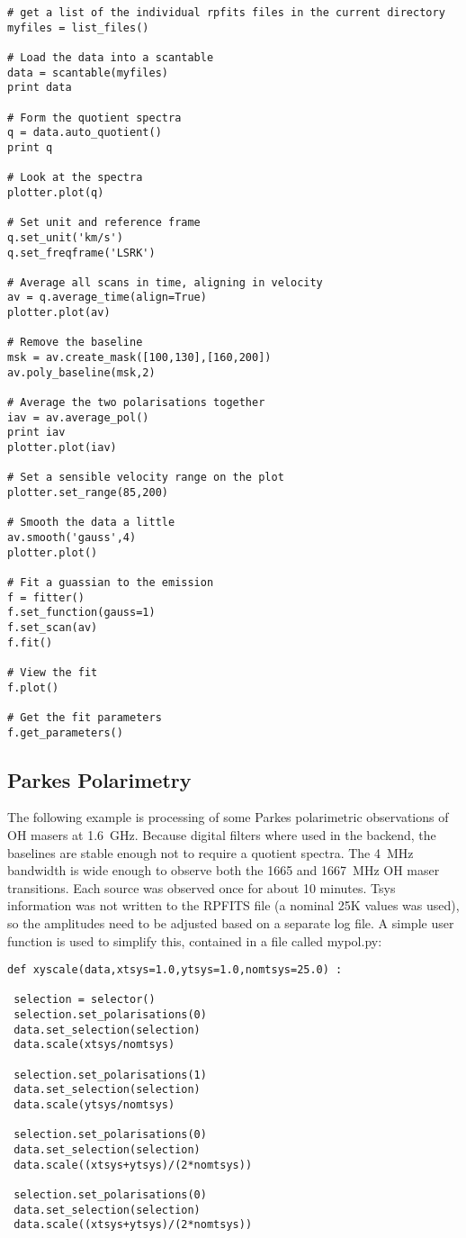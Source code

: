 \documentclass[11pt]{article}
\begin{document}
\begin{verbatim}
# get a list of the individual rpfits files in the current directory
myfiles = list_files()

# Load the data into a scantable
data = scantable(myfiles)
print data

# Form the quotient spectra
q = data.auto_quotient()
print q

# Look at the spectra
plotter.plot(q)

# Set unit and reference frame
q.set_unit('km/s')
q.set_freqframe('LSRK')

# Average all scans in time, aligning in velocity
av = q.average_time(align=True)
plotter.plot(av)

# Remove the baseline
msk = av.create_mask([100,130],[160,200])
av.poly_baseline(msk,2)

# Average the two polarisations together
iav = av.average_pol()
print iav
plotter.plot(iav)

# Set a sensible velocity range on the plot
plotter.set_range(85,200)

# Smooth the data a little
av.smooth('gauss',4)
plotter.plot()

# Fit a guassian to the emission
f = fitter()
f.set_function(gauss=1)
f.set_scan(av)
f.fit()

# View the fit
f.plot()

# Get the fit parameters
f.get_parameters()

\end{verbatim}


\subsection{Parkes Polarimetry}

The following example is processing
of some Parkes polarimetric observations of OH masers at
1.6~GHz. Because digital filters where used in the backend, the
baselines are stable enough not to require a quotient spectra. The
4~MHz bandwidth is wide enough to observe both the 1665 and 1667~MHz
OH maser transitions. Each source was observed once for about 10
minutes. Tsys information was not written to the RPFITS file (a
nominal 25K values was used), so the amplitudes need to be adjusted
based on a separate log file. A simple user function is used to
simplify this, contained in a file called mypol.py:

\begin{verbatim}
def xyscale(data,xtsys=1.0,ytsys=1.0,nomtsys=25.0) :

 selection = selector()
 selection.set_polarisations(0)
 data.set_selection(selection)
 data.scale(xtsys/nomtsys)

 selection.set_polarisations(1)
 data.set_selection(selection)
 data.scale(ytsys/nomtsys)

 selection.set_polarisations(0)
 data.set_selection(selection)
 data.scale((xtsys+ytsys)/(2*nomtsys))

 selection.set_polarisations(0)
 data.set_selection(selection)
 data.scale((xtsys+ytsys)/(2*nomtsys))
\end{verbatim}
\end{document}
